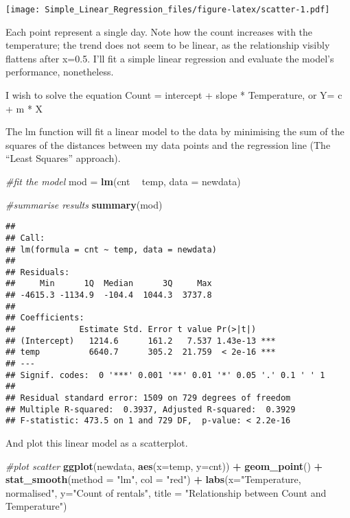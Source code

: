 \documentclass[]{article}
\newenvironment{Shaded}{\begin{snugshade}}{\end{snugshade}}
\newcommand{\KeywordTok}[1]{\textcolor[rgb]{0.13,0.29,0.53}{\textbf{#1}}}
\newcommand{\DataTypeTok}[1]{\textcolor[rgb]{0.13,0.29,0.53}{#1}}
\newcommand{\StringTok}[1]{\textcolor[rgb]{0.31,0.60,0.02}{#1}}
\newcommand{\CommentTok}[1]{\textcolor[rgb]{0.56,0.35,0.01}{\textit{#1}}}
\newcommand{\OperatorTok}[1]{\textcolor[rgb]{0.81,0.36,0.00}{\textbf{#1}}}
\newcommand{\NormalTok}[1]{#1}
\begin{document}
\texttt{[image: Simple\_Linear\_Regression\_files/figure-latex/scatter-1.pdf]}

Each point represent a single day. Note how the count increases with the
temperature; the trend does not seem to be linear, as the relationship
visibly flattens after x=0.5. I'll fit a simple linear regression and
evaluate the model's performance, nonetheless.

I wish to solve the equation Count = intercept + slope * Temperature, or
Y= c + m * X

The lm function will fit a linear model to the data by minimising the
sum of the squares of the distances between my data points and the
regression line (The ``Least Squares'' approach).

\begin{Shaded}
\begin{Highlighting}[]
\CommentTok{#fit the model}
\NormalTok{mod =}\StringTok{ }\KeywordTok{lm}\NormalTok{(cnt }\OperatorTok{~}\StringTok{ }\NormalTok{temp, }\DataTypeTok{data =}\NormalTok{ newdata)}

\CommentTok{#summarise results}
\KeywordTok{summary}\NormalTok{(mod)}
\end{Highlighting}
\end{Shaded}

\begin{verbatim}
## 
## Call:
## lm(formula = cnt ~ temp, data = newdata)
## 
## Residuals:
##     Min      1Q  Median      3Q     Max 
## -4615.3 -1134.9  -104.4  1044.3  3737.8 
## 
## Coefficients:
##             Estimate Std. Error t value Pr(>|t|)    
## (Intercept)   1214.6      161.2   7.537 1.43e-13 ***
## temp          6640.7      305.2  21.759  < 2e-16 ***
## ---
## Signif. codes:  0 '***' 0.001 '**' 0.01 '*' 0.05 '.' 0.1 ' ' 1
## 
## Residual standard error: 1509 on 729 degrees of freedom
## Multiple R-squared:  0.3937, Adjusted R-squared:  0.3929 
## F-statistic: 473.5 on 1 and 729 DF,  p-value: < 2.2e-16
\end{verbatim}

And plot this linear model as a scatterplot.

\begin{Shaded}
\begin{Highlighting}[]
\CommentTok{#plot scatter}
\KeywordTok{ggplot}\NormalTok{(newdata, }\KeywordTok{aes}\NormalTok{(}\DataTypeTok{x=}\NormalTok{temp, }\DataTypeTok{y=}\NormalTok{cnt)) }\OperatorTok{+}\StringTok{ }
\StringTok{  }\KeywordTok{geom_point}\NormalTok{() }\OperatorTok{+}\StringTok{ }
\StringTok{  }\KeywordTok{stat_smooth}\NormalTok{(}\DataTypeTok{method =} \StringTok{"lm"}\NormalTok{, }\DataTypeTok{col =} \StringTok{"red"}\NormalTok{) }\OperatorTok{+}
\StringTok{  }\KeywordTok{labs}\NormalTok{(}\DataTypeTok{x=}\StringTok{"Temperature, normalised"}\NormalTok{, }\DataTypeTok{y=}\StringTok{"Count of rentals"}\NormalTok{, }\DataTypeTok{title =} \StringTok{"Relationship between Count and Temperature"}\NormalTok{)}
\end{Highlighting}
\end{Shaded}
\end{document}
